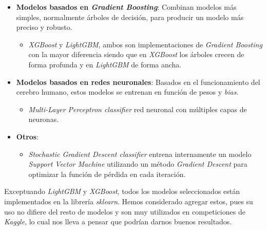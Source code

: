 \begin{itemize}
\begin{itemize}
        \end{itemize}
    \item \textbf{Modelos basados en \textit{Gradient Boosting}}: Combinan modelos más simples, normalmente árboles de decisión, para producir un modelo más preciso y robusto.\ \cite{Gradient97:online}
    \begin{itemize}
        \item \textit{XGBoost} y \textit{LightGBM}, ambos son implementaciones de \textit{Gradient Boosting} con la mayor diferencia siendo que en \textit{XGBoost} los árboles crecen de forma profunda y en \textit{LightGBM} de forma ancha. \cite{XGBoostv70:online}  
    \end{itemize}
    \item \textbf{Modelos basados en redes neuronales}: Basados en el funcionamiento del cerebro humano, estos modelos se entrenan en función de pesos y \textit{bias}.
        \begin{itemize}
            \item \textit{Multi-Layer Perceptron classifier} red neuronal con múltiples capas de neuronas. \cite{Multilay51:online}
        \end{itemize}
    \item \textbf{Otros}:
    \begin{itemize}
        \item \textit{Stochastic Gradient Descent classifier} entrena internamente un modelo  \textit{Support Vector Machine} utilizando un método \textit{Gradient Descent} para optimizar la función de pérdida en cada iteración. \cite{SGDClass46:online}
    \end{itemize}
\end{itemize}

Exceptuando \textit{LightGBM} y \textit{XGBoost}, todos los modelos seleccionados están implementados en la librería \textit{sklearn}. Hemos considerado agregar estos, pues su uso no difiere del resto de modelos y son muy utilizados en competiciones de \textit{Kaggle}, lo cual nos lleva a pensar que podrían darnos buenos resultados.